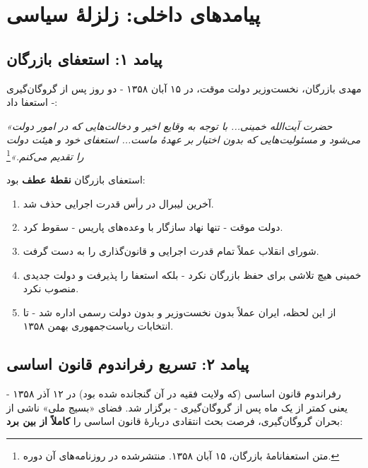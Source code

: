 \documentclass[12pt,a4paper]{book}
\newcommand{\keyword}[1]{\textbf{\textcolor{cPrimary}{#1}}}
\begin{document}
\section{پیامدهای داخلی: زلزلهٔ سیاسی}

\subsection{پیامد ۱: استعفای بازرگان}

مهدی بازرگان، نخست‌وزیر دولت موقت، در ۱۵ آبان ۱۳۵۸ - دو روز پس از گروگان‌گیری - استعفا داد:

\begin{noteBox}
\textit{«حضرت آیت‌الله خمینی... با توجه به وقایع اخیر و دخالت‌هایی که در امور دولت می‌شود و مسئولیت‌هایی که بدون اختیار بر عهدهٔ ماست... استعفای خود و هیئت دولت را تقدیم می‌کنم.»}\footnote{متن استعفانامهٔ بازرگان، ۱۵ آبان ۱۳۵۸. منتشرشده در روزنامه‌های آن دوره.}
\end{noteBox}

\begin{principleBox}
استعفای بازرگان \keyword{نقطهٔ عطف} بود:
\begin{enumerate}[label=\textcolor{cPrimary}{\bfseries\arabic*.}, rightmargin=2em]
    \item آخرین لیبرال در رأس قدرت اجرایی حذف شد.
    \item دولت موقت - تنها نهاد سازگار با وعده‌های پاریس - سقوط کرد.
    \item شورای انقلاب عملاً تمام قدرت اجرایی و قانون‌گذاری را به دست گرفت.
    \item خمینی هیچ تلاشی برای حفظ بازرگان نکرد - بلکه استعفا را پذیرفت و دولت جدیدی منصوب نکرد.
    \item از این لحظه، ایران عملاً بدون نخست‌وزیر و بدون دولت رسمی اداره شد - تا انتخابات ریاست‌جمهوری بهمن ۱۳۵۸.
\end{enumerate}
\end{principleBox}

\subsection{پیامد ۲: تسریع رفراندوم قانون اساسی}

رفراندوم قانون اساسی (که ولایت فقیه در آن گنجانده شده بود) در ۱۲ آذر ۱۳۵۸ - یعنی کمتر از یک ماه پس از گروگان‌گیری - برگزار شد. فضای «بسیج ملی» ناشی از بحران گروگان‌گیری، فرصت بحث انتقادی دربارهٔ قانون اساسی را \keyword{کاملاً از بین برد}:
\end{document}
